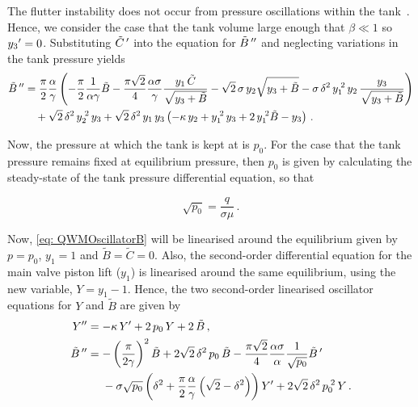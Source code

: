 The flutter instability does not occur from pressure oscillations within the tank~\cite{Allison2015TestingValves}. Hence, we consider the case that the tank volume large enough that $\beta \ll 1$ so $y_3{'} = 0$. Substituting $\tilde{C}\,{'}$ into the equation for $\tilde{B}\,{''}$ and neglecting variations in the tank pressure yields
~
\begin{equation} \label{eq: QWMOscillatorB}
\begin{split}
    \ddash{\tilde{B}\,} &= \frac{\pi}{2} \frac{\alpha}{\gamma} \left( - \frac{\pi}{2} \frac{1}{\alpha \gamma} \tilde{B} - \frac{\pi \sqrt{2}}{4} \frac{\alpha \sigma}{\gamma} \frac{y_1 \, \tilde{C}}{\sqrt{y_3 + \tilde{B}}} - \sqrt{2} \, \sigma \, y_2 \sqrt{y_3 + \tilde{B}} - \sigma \, \delta^2 \, y_1\power{2} \, y_2 \, \frac{y_3}{\sqrt{y_3 + \tilde{B}}} \right)
    \\ & \quad %
    + \sqrt{2} \, \delta^2 \, y_2\power{2} \, y_3
    + \sqrt{2} \, \delta^2 \, y_1 \, y_3 \left( - \kappa \, y_2 + y_1\power{2} \, y_3 + 2 \, y_1 \power{2} \tilde{B} - y_3 \right) \, .
\end{split}
\end{equation}

Now, the pressure at which the tank is kept at is $p_0$. For the case that the tank pressure remains fixed at equilibrium pressure, then $p_0$ is given by calculating the steady-state of the tank pressure differential equation, so that

\begin{equation*}
    \sqrt{p_0} = \frac{q}{\sigma \mu} \, .
\end{equation*}

Now, \cref{eq: QWMOscillatorB} will be linearised around the equilibrium given by $p = p_0$, $y_1 = 1$ and $\tilde{B} = \tilde{C} = 0$. Also, the second-order differential equation for the main valve piston lift ($y_1$) is linearised around the same equilibrium, using the new variable, $Y = y_1 - 1$. Hence, the two second-order linearised oscillator equations for $Y$ and $\tilde{B}$ are given by
~
\begin{equation} \label{eq: YandBOscil}
\begin{split}
    \ddash{Y} &= - \kappa \, \dash{Y} + 2 \, p_0 \, Y + 2 \, \tilde{B} \, , \\
    \ddash{\tilde{B}\,} &= - \left( \frac{\pi}{2 \gamma} \right)^2 \tilde{B} + 2 \sqrt{2} \, \delta^2 \, p_0 \, \tilde{B} - \frac{\pi \sqrt{2}}{4} \frac{\alpha \sigma}{\alpha} \frac{1}{\sqrt{p_0}} \dash{\tilde{B}\,}
    \\ & \quad \, \, %
    - \sigma \sqrt{p_0} \left( \delta^2 + \frac{\pi}{2} \frac{\alpha}{\gamma} \left( \sqrt{2} - \delta^2 \right) \right) \dash{Y} + 2 \sqrt{2} \, \delta^2 \, p_0\power{2} \, Y \, .
\end{split}
\end{equation}

